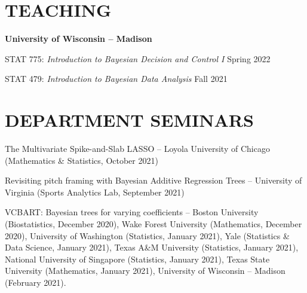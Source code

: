 \documentclass[margin]{res}
\begin{document}
\begin{resume}
\section{TEACHING}

\textbf{University of Wisconsin -- Madison} 

STAT 775: {\it Introduction to Bayesian Decision and Control I} \hfill Spring 2022

STAT 479: {\it Introduction to Bayesian Data Analysis} \hfill Fall 2021












\section{DEPARTMENT \hspace{0.1in} SEMINARS}

The Multivariate Spike-and-Slab LASSO -- Loyola University of Chicago (Mathematics \& Statistics, October 2021)

Revisiting pitch framing with Bayesian Additive Regression Trees -- University of Virginia (Sports Analytics Lab, September 2021)

VCBART: Bayesian trees for varying coefficients -- Boston University (Biostatistics, December 2020), Wake Forest University (Mathematics, December 2020), University of Washington (Statistics, January 2021), 
Yale (Statistics \& Data Science, January 2021), Texas A\&M University (Statistics, January 2021), National University of Singapore (Statistics, January 2021), Texas State University (Mathematics, January 2021), University of Wisconsin -- Madison (February 2021). 


\end{resume}
\end{document}
